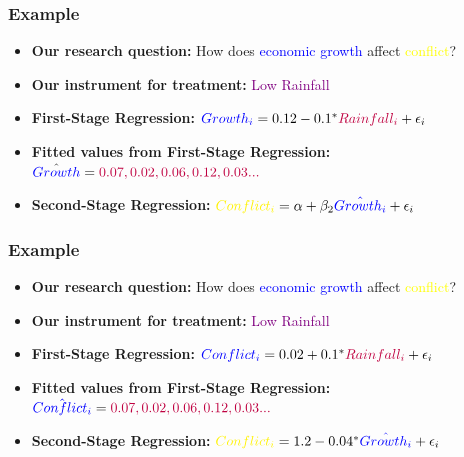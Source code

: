 \documentclass[xcolor=x11names,compress]{beamer}\usepackage[]{graphicx}\usepackage[]{color}
\renewcommand{\(}{\begin{columns}}
\renewcommand{\)}{\end{columns}}
\newcommand{\<}[1]{\begin{column}{#1}}
\renewcommand{\>}{\end{column}}
\begin{document}
\begin{frame}
\frametitle{Example}
\begin{itemize}
\item \textbf{Our research question:} How does \textcolor{blue}{economic growth} affect \textcolor{yellow}{conflict}?
\item \textbf{Our instrument for treatment:} \textcolor{purple}{Low Rainfall}
\item \textbf{First-Stage Regression:} $\textcolor{blue}{Growth_i} = 0.12 - 0.1^{*} \textcolor{purple}{Rainfall_i} + \epsilon_i$
\item \textbf{Fitted values from First-Stage Regression:} $\hat{\textcolor{blue}{Growth}} = \textcolor{purple}{0.07, 0.02, 0.06, 0.12, 0.03...}$
\pause
\item \textbf{Second-Stage Regression:} $\textcolor{yellow}{Conflict_i} = \alpha + \beta_2 \textcolor{blue}{\hat{Growth_i}} + \epsilon_i$
\end{itemize}
\end{frame}

\begin{frame}
\frametitle{Example}
\begin{itemize}
\item \textbf{Our research question:} How does \textcolor{blue}{economic growth} affect \textcolor{yellow}{conflict}?
\item \textbf{Our instrument for treatment:} \textcolor{purple}{Low Rainfall}
\item \textbf{First-Stage Regression:} $\textcolor{blue}{Conflict_i} = 0.02 + 0.1^{*} \textcolor{purple}{Rainfall_i} + \epsilon_i$
\item \textbf{Fitted values from First-Stage Regression:} $\textcolor{blue}{\hat{Conflict_i}} = \textcolor{purple}{0.07, 0.02, 0.06, 0.12, 0.03...}$
\item \textbf{Second-Stage Regression:} $\textcolor{yellow}{Conflict_i} = 1.2 - 0.04^{*} \textcolor{blue}{\hat{Growth_i}} + \epsilon_i$
\end{itemize}
\end{frame}
\end{document}

